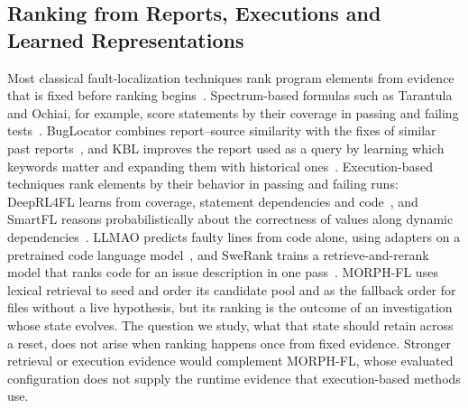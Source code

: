 \documentclass[a4paper,fleqn]{cas-sc}
\newcommand{\tool}{MORPH-FL}
\begin{document}
\subsection{Ranking from Reports, Executions and Learned Representations}
Most classical fault-localization techniques rank program elements from evidence that is fixed before ranking begins~\citep{flsurvey2016,llmflsurvey2025}. Spectrum-based formulas such as Tarantula and Ochiai, for example, score statements by their coverage in passing and failing tests~\citep{tarantula2005,ochiai2007}. BugLocator combines report--source similarity with the fixes of similar past reports~\citep{buglocator2012}, and KBL improves the report used as a query by learning which keywords matter and expanding them with historical ones~\citep{kbl2025}. Execution-based techniques rank elements by their behavior in passing and failing runs: DeepRL4FL learns from coverage, statement dependencies and code~\citep{deeprl4fl2021}, and SmartFL reasons probabilistically about the correctness of values along dynamic dependencies~\citep{smartfl2025}. LLMAO predicts faulty lines from code alone, using adapters on a pretrained code language model~\citep{llmao2024}, and SweRank trains a retrieve-and-rerank model that ranks code for an issue description in one pass~\citep{swerank2026}. \tool{} uses lexical retrieval to seed and order its candidate pool and as the fallback order for files without a live hypothesis, but its ranking is the outcome of an investigation whose state evolves. The question we study, what that state should retain across a reset, does not arise when ranking happens once from fixed evidence. Stronger retrieval or execution evidence would complement \tool{}, whose evaluated configuration does not supply the runtime evidence that execution-based methods use.
\end{document}
